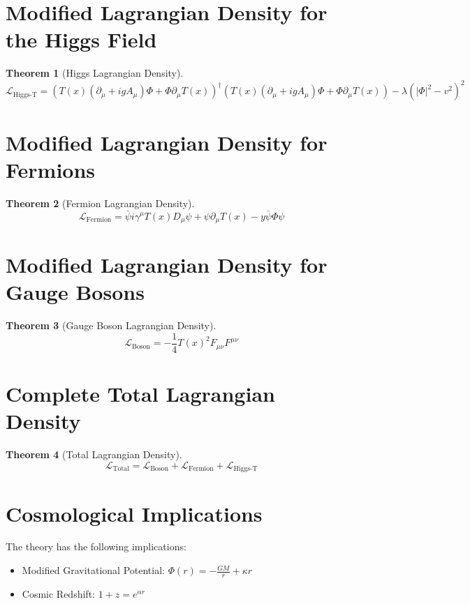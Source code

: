 \documentclass{article}
\newcommand{\Tfield}{T(x)}
\newcommand{\DcovT}[1]{\Tfield D_\mu #1 + #1 \partial_\mu \Tfield}
\newcommand{\DhiggsT}{\Tfield (\partial_\mu + igA_\mu)\Phi + \Phi \partial_\mu \Tfield}
\newtheorem{theorem}{Theorem}[section]
\theoremstyle{definition}
\theoremstyle{remark}
\begin{document}
	\section{Modified Lagrangian Density for the Higgs Field}
	\begin{theorem}[Higgs Lagrangian Density]
		\begin{equation}
			\mathcal{L}_{\text{Higgs-T}} = (\DhiggsT)^\dagger (\DhiggsT) - \lambda(|\Phi|^2 - v^2)^2
		\end{equation}
	\end{theorem}
	
	\section{Modified Lagrangian Density for Fermions}
	\begin{theorem}[Fermion Lagrangian Density]
		\begin{equation}
			\mathcal{L}_{\text{Fermion}} = \bar{\psi} i \gamma^\mu \DcovT{\psi} - y \bar{\psi} \Phi \psi
		\end{equation}
	\end{theorem}
	
	\section{Modified Lagrangian Density for Gauge Bosons}
	\begin{theorem}[Gauge Boson Lagrangian Density]
		\begin{equation}
			\mathcal{L}_{\text{Boson}} = -\frac{1}{4} \Tfield^2 F_{\mu\nu} F^{\mu\nu}
		\end{equation}
	\end{theorem}
	
	\section{Complete Total Lagrangian Density}
	\begin{theorem}[Total Lagrangian Density]
		\begin{equation}
			\mathcal{L}_{\text{Total}} = \mathcal{L}_{\text{Boson}} + \mathcal{L}_{\text{Fermion}} + \mathcal{L}_{\text{Higgs-T}}
		\end{equation}
	\end{theorem}
	
	\section{Cosmological Implications}
	The theory has the following implications:
	\begin{itemize}
		\item Modified Gravitational Potential: \( \Phi(r) = -\frac{GM}{r} + \kappa r \)
		\item Cosmic Redshift: \( 1 + z = e^{\alpha r} \)
	\end{itemize}
	

	
\end{document}
